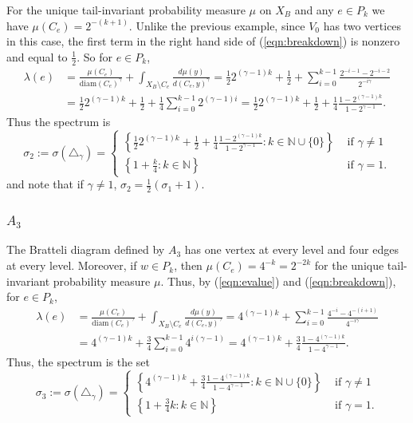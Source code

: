 \documentclass[12pt]{amsart}
\theoremstyle{plain}
\theoremstyle{definition}
\begin{document}
For the unique tail-invariant probability measure $\mu$ on $X_B$ and any $e\in P_k$ we have $\mu(C_e) = 2^{-(k+1)}$. Unlike the previous example, since $V_0$ has two vertices in this case, the first term in the right hand side of (\ref{eqn:breakdown}) is nonzero and equal to $\frac12$. So for $e\in P_k$,
\begin{equation*}
\begin{split}
\lambda(e) &= \frac{\mu(C_e)}{\mathrm{diam}(C_e)^\gamma}+\int_{X_B\setminus C_e} \frac{d\mu(y)}{d(C_e,y)^\gamma}  = \frac12 2^{(\gamma-1)k}+ \frac12 +\sum_{i=0}^{k-1} \frac{2^{-i-1}-2^{-i-2}}{2^{-i\gamma}}\\
& = \frac12 2^{(\gamma-1)k}+\frac12 + \frac14 \sum_{i=0}^{k-1} 2^{(\gamma-1)i} = \frac12 2^{(\gamma-1)k}+ \frac12 + \frac{1}{4}\frac{1-2^{(\gamma-1)k}}{1-2^{\gamma-1}}.
\end{split}
\end{equation*}
Thus the spectrum is 
\begin{equation}
\label{eqn:spec2}
    \sigma_2:=\sigma(\triangle_\gamma) = \begin{cases}
        \left\{ \frac12 2^{(\gamma-1)k}+ \frac12 + \frac{1}{4}\frac{1-2^{(\gamma-1)k}}{1-2^{\gamma-1}} : k\in\mathbb{N}\cup\{0\}\right\} &\mbox{ if }\gamma\neq 1\\
        \left\{ 1+\frac{k}{4}:k\in\mathbb{N} \right\}&\mbox{ if }\gamma = 1 .
    \end{cases}
\end{equation}
and note that if $\gamma \neq 1$, $\sigma_2  = \frac12 (\sigma_1+ 1)$.
\subsubsection{$A_3$}
The Bratteli diagram defined by $A_3$ has one vertex at every level and four edges at every level. Moreover, if $w\in P_k$, then $\mu(C_e) = 4^{-k} = 2^{-2k}$ for the unique tail-invariant probability measure $\mu$. Thus, by (\ref{eqn:evalue}) and (\ref{eqn:breakdown}), for $e\in P_k$,
\begin{equation*}
\begin{split}
\lambda(e) &= \frac{\mu(C_e)}{\mathrm{diam}(C_e)^\gamma}+\int_{X_B\setminus C_e} \frac{d\mu(y)}{d(C_e,y)^\gamma}  = 4^{(\gamma-1)k}+ \sum_{i=0}^{k-1} \frac{4^{-i}-4^{-(i+1)}}{4^{-i\gamma}}\\
& = 4^{(\gamma-1)k}+ \frac{3}{4}\sum_{i=0}^{k-1} 4^{i(\gamma-1)} = 4^{(\gamma-1)k}+ \frac{3}{4}\frac{1-4^{(\gamma-1)k}}{1-4^{\gamma-1}}.
\end{split}
\end{equation*}
Thus, the spectrum is the set
\begin{equation}
\label{eqn:spec3}
    \sigma_3:=\sigma(\triangle_\gamma) = \begin{cases}
        \left\{ 4^{(\gamma-1)k}+ \frac{3}{4}\frac{1-4^{(\gamma-1)k}}{1-4^{\gamma-1}} : k\in\mathbb{N}\cup \{0\}\right\} &\mbox{ if }\gamma\neq 1\\
        \left\{ 1+\frac{3}{4}k:k\in\mathbb{N} \right\}&\mbox{ if }\gamma = 1 .
    \end{cases}
\end{equation}
\end{document}
